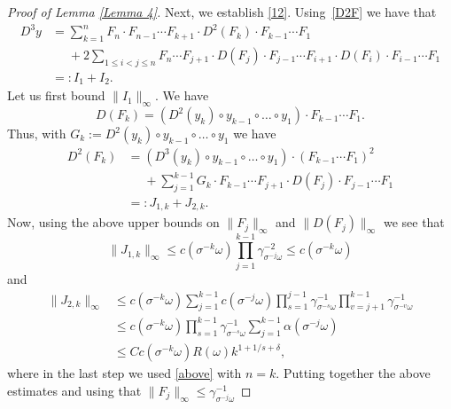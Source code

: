 \documentclass[11pt,reqno,a4paper]{article}
\theoremstyle{special}
\def\om{\omega}
\begin{document}
\begin{proof}[Proof of Lemma \ref{Lemma 4}]
Next, we establish \eqref{12}.
Using~\eqref{D2F} we have that 
  \begin{equation}\label{D 3}
  \begin{split}
D^3y &=\sum_{k=1}^nF_n\cdot F_{n-1}\cdots F_{k+1}\cdot D^2(F_k)\cdot F_{k-1}\cdots F_1    \\  
&\phantom{=}+2\sum_{1\leq i<j\leq n}F_n\cdots F_{j+1}\cdot D(F_j) \cdot F_{j-1}\cdots F_{i+1}\cdot D(F_i)\cdot F_{i-1}\cdots F_1  \\
&=:I_1+I_2.
\end{split}
\end{equation}
  Let us first bound $\|I_1\|_\infty$. 
 We have 
 \begin{equation}\label{F 1}
D(F_k)=\left(D^2(y_k)\circ y_{k-1}\circ\ldots\circ y_1\right)\cdot F_{k-1}\cdots F_1.
 \end{equation}
  Thus, with $G_k :=D^2(y_k)\circ y_{k-1}\circ\ldots\circ y_1$ we have
 \begin{equation}\label{F 2}
 \begin{split}
D^2(F_k) &=\left(D^3(y_k)\circ y_{k-1}\circ\ldots \circ y_1\right)\cdot (F_{k-1}\cdots F_1)^2 \\
&\phantom{=}+\sum_{j=1}^{k-1}G_k\cdot F_{k-1}\cdots F_{j+1}\cdot D(F_j)\cdot F_{j-1}\cdots F_1 \\
&=:J_{1,k}+J_{2,k}.
\end{split}
\end{equation}
Now, using the above upper bounds on $\|F_{j}\|_\infty$ and $\|D(F_j)\|_\infty$ we see that
\begin{equation}\label{J k 1}
\|J_{1,k}\|_\infty\leq c(\sigma^{-k}\om)\prod_{j=1}^{k-1}\gamma_{\sigma^{-j}\om}^{-2}\leq c(\sigma^{-k}\om)   
\end{equation}
and 
\begin{equation}\label{J k 2}
\begin{split}
\|J_{2,k}\|_\infty &\leq c(\sigma^{-k}\om)  \sum_{j=1}^{k-1}c(\sigma^{-j}\om)\prod_{s=1}^{j-1}\gamma_{\sigma^{-s}\om}^{-1}\prod_{v=j+1}^{k-1}\gamma_{\sigma^{-v}\om}^{-1} \\
&\leq c(\sigma^{-k}\om)\prod_{s=1}^{k-1}\gamma_{\sigma^{-s}\om}^{-1}
\sum_{j=1}^{k-1}\alpha(\sigma^{-j}\omega) \\
&\leq Cc(\sigma^{-k}\om)R(\om)k^{1+1/s+\delta},
\end{split}
\end{equation}
where in the last step we used \eqref{above} with  $n=k$.
Putting together the above estimates and using that $\|F_j\|_\infty\leq \gamma_{\sigma^{-j}\om}^{-1}$

\end{proof}
\end{document}
